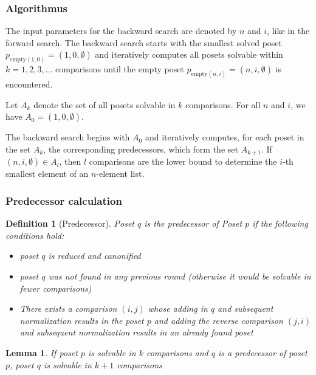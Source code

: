 \documentclass[10pt,journal,compsoc]{IEEEtran}
\newtheorem{lemma}{Lemma}
\newtheorem{definition}{Definition}
\begin{document}
\subsubsection{Algorithmus} \label{sec:backward:algorithm}
The input parameters for the backward search are denoted by $n$ and $i$, like in the forward search.
The backward search starts with the smallest solved poset $p_{\text{empty} (1, 0)} = (1, 0, \emptyset)$ and iteratively computes all posets solvable within $k = 1, 2, 3, \dots$ comparisons until the empty poset $p_{\text{empty} (n, i)} = (n, i, \emptyset)$ is encountered.

Let $A_k$ denote the set of all posets solvable in $k$ comparisons.
For all $n$ and $i$, we have $A_0 = { (1, 0, \emptyset) }$.

The backward search begins with $A_0$ and iteratively computes, for each poset in the set $A_k$, the corresponding predecessors, which form the set $A_{k + 1}$.
If $(n, i, \emptyset) \in A_l$, then $l$ comparisons are the lower bound to determine the $i$-th smallest element of an $n$-element list.


\subsubsection{Predecessor calculation} \label{sec:backward:predecessor_calculation}

\begin{definition}[Predecessor] \label{definition:predecessor_calculation}
  Poset $q$ is the predecessor of Poset $p$ if the following conditions hold:
  \begin{itemize}
    \item poset $q$ is reduced and canonified
    \item poset $q$ was not found in any previous round (otherwise it would be solvable in fewer comparisons)
    \item There exists a comparison $(i, j)$ whose adding in $q$ and subsequent normalization results in the poset $p$ and adding the reverse comparison $(j, i)$ and subsequent normalization results in an already found poset
  \end{itemize}
\end{definition}

\begin{lemma} \label{lemma:predecessor_calculation}
  If poset $p$ is solvable in $k$ comparisons and $q$ is a predecessor of poset $p$, poset $q$ is solvable in $k + 1$ comparisons
\end{lemma}
\end{document}
